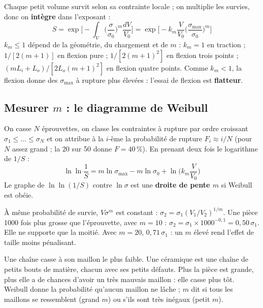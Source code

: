 \begin{propbox}[title={Contrainte non uniforme : le facteur $k_m$}]
Chaque petit volume survit selon sa contrainte locale ; on multiplie les survies, donc on
\textbf{intègre} dans l'exposant :
\[ S = \exp\!\Big[-\int_V \Big(\frac{\sigma}{\sigma_0}\Big)^m\frac{dV}{V_0}\Big]
     = \exp\!\Big[-k_m\frac{V}{V_0}\Big(\frac{\sigma_{\max}}{\sigma_0}\Big)^m\Big] \]
$k_m \le 1$ dépend de la géométrie, du chargement et de $m$ : $k_m = 1$ en traction ;
$1/[2(m+1)]$ en flexion pure ; $1/[2(m+1)^2]$ en flexion trois points ;
$(mL_i + L_o)/[2L_o(m+1)^2]$ en flexion quatre points. Comme $k_m < 1$, la flexion donne des
$\sigma_{\max}$ à rupture plus élevées : l'essai de flexion est \textbf{\og flatteur\fg{}}.
\end{propbox}

\subsection*{Mesurer $m$ : le diagramme de Weibull}

On casse $N$ éprouvettes, on classe les contraintes à rupture par ordre croissant
$\sigma_1 \le \ldots \le \sigma_N$ et on attribue à la $i$-ème la probabilité de rupture
$F_i \approx i/N$ (pour $N$ assez grand ; la 20 sur 50 donne $F = 40\,\%$). En prenant deux
fois le logarithme de $1/S$ :
\[ \ln\ln\frac{1}{S} = m\ln\sigma_{\max} - m\ln\sigma_0 + \ln\Big(k_m\frac{V}{V_0}\Big) \]
Le graphe de $\ln\ln(1/S)$ contre $\ln\sigma$ est une \textbf{droite de pente $m$} si Weibull est
obéie.


\begin{exbox}[title={Exemple chiffré (pas dans les diapositives) : l'effet de volume}]
À même probabilité de survie, $V\sigma^m$ est constant :
$\sigma_2 = \sigma_1 (V_1/V_2)^{1/m}$. Une pièce 1000 fois plus grosse que l'éprouvette, avec
$m = 10$ : $\sigma_2 = \sigma_1 \times 1000^{-0{,}1} = 0{,}50\,\sigma_1$. Elle ne supporte que la
moitié. Avec $m = 20$, $0{,}71\,\sigma_1$ : un $m$ élevé rend l'effet de taille moins
pénalisant.
\end{exbox}

\begin{goatbox}
Une chaîne casse à son maillon le plus faible. Une céramique est une chaîne de petits bouts de
matière, chacun avec ses petits défauts. Plus la pièce est grande, plus elle a de chances
d'avoir un très mauvais maillon : elle casse plus tôt. Weibull donne la probabilité qu'aucun
maillon ne lâche ; $m$ dit si tous les maillons se ressemblent (grand $m$) ou s'ils sont très
inégaux (petit $m$).
\end{goatbox}

